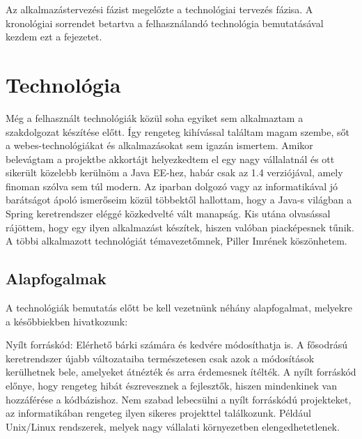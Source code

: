 




 
Az alkalmazástervezési fázist megelőzte a technológiai tervezés fázisa. A kronológiai sorrendet betartva a felhasználandó technológia bemutatásával kezdem ezt a fejezetet.  

\section{Technológia}
Még a felhasznált technológiák közül soha egyiket sem alkalmaztam a szakdolgozat készítése előtt. Így rengeteg kihívással találtam magam szembe, sőt a webes-technológiákat és alkalmazásokat sem igazán ismertem. Amikor belevágtam a projektbe akkortájt helyezkedtem el egy nagy vállalatnál és ott sikerült közelebb kerülnöm a Java EE-hez, habár csak az 1.4 verziójával, amely finoman szólva sem túl modern. Az iparban dolgozó vagy az informatikával jó barátságot ápoló ismerőseim közül többektől hallottam, hogy a Java-s világban a Spring keretrendszer eléggé közkedvelté vált manapság. Kis utána olvasással rájöttem, hogy egy ilyen alkalmazást készítek, hiszen valóban piacképesnek tűnik. A többi alkalmazott technológiát témavezetőmnek, Piller Imrének köszönhetem. 

\subsection{Alapfogalmak}
A technológiák bemutatás előtt be kell vezetnünk néhány alapfogalmat, melyekre a későbbiekben hivatkozunk:

Nyílt forráskód: Elérhető bárki számára és kedvére módosíthatja is. A fősodrású keretrendszer újabb változataiba természetesen csak azok a módosítások kerülhetnek bele, amelyeket átnézték és arra érdemesnek ítélték. A nyílt forráskód előnye, hogy rengeteg hibát észrevesznek a fejlesztők, hiszen mindenkinek van hozzáférése a kódbázishoz. Nem szabad lebecsülni a nyílt forráskódú projekteket, az informatikában rengeteg ilyen sikeres projekttel találkozunk. Például Unix/Linux rendszerek, melyek nagy vállalati környezetben elengedhetetlenek.

